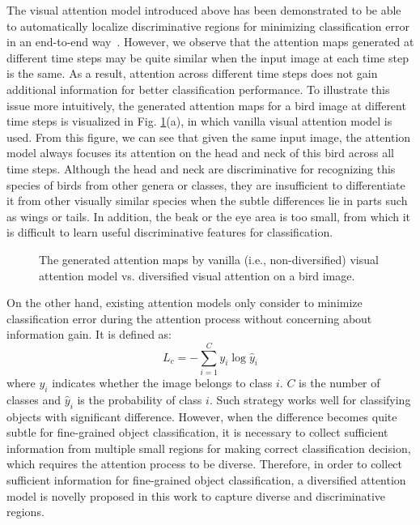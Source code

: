 \documentclass[journal]{IEEEtran}
\begin{document}
The visual attention model introduced above has been demonstrated to be able to automatically localize discriminative regions for minimizing classification error in an end-to-end way~\cite{ram, action_recognition}. However, we observe that the attention maps generated at different time steps may be quite similar when the input image at each time step is the same. As a result, attention across different time steps does not gain additional information for better classification performance. To illustrate this issue more intuitively, the generated attention maps for a bird image at different time steps is visualized in Fig. \ref{fig:diversify_comparison}(a), in which vanilla visual attention model is used. From this figure, we can see that given the same input image, the attention model always focuses its attention on the head and neck of this bird across all time steps. Although the head and neck are discriminative for recognizing this species of birds from other genera or classes, they are insufficient to differentiate it from other visually similar species when the subtle differences lie in parts such as wings or tails. In addition, the beak or the eye area is too small, from which it is difficult to learn useful discriminative features for classification.
\begin{figure}[t]
	\centering
    \vspace{-0.1in}
	\hfil
	\hfil
	\caption{The generated attention maps by vanilla (i.e., non-diversified) visual attention model vs. diversified visual attention on a bird image.}
	\label{fig:diversify_comparison}
	\vspace{-0.2in}
\end{figure}

On the other hand, existing attention models only consider to minimize classification error during the attention process without concerning about information gain. It is defined as:
\begin{equation}
L_c=-\sum_{i=1}^{C}y_{i}\log\hat{y}_{i}
\end{equation}
where $y_i$ indicates whether the image belongs to class $i$. $C$ is the number of classes and $\hat y_i$ is the probability of class $i$.
Such strategy works well for classifying objects with significant difference. However, when the difference becomes quite subtle for fine-grained object classification, it is necessary to collect sufficient information from multiple small regions for making correct classification decision, which requires the attention process to be diverse. Therefore, in order to collect sufficient information for fine-grained object classification, a diversified attention model is novelly proposed in this work to capture diverse and discriminative regions.
\end{document}
